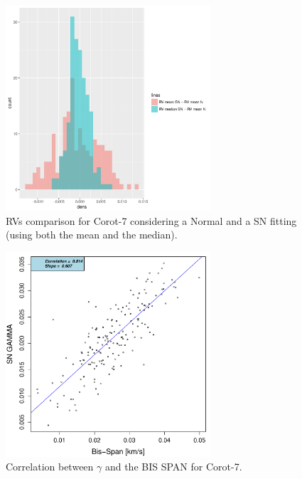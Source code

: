 \documentclass{aa}
\begin{document}
%
\begin{figure}[htbp]
   \centering
\includegraphics[height = 3in]{[0]LRa01_E_HistogramsDiff.pdf} 
   \caption{RVs comparison for Corot-7 considering a Normal and a SN fitting (using both the mean and the median).}
   \label{fig:corot7:RV}
\end{figure}
%
\begin{figure}[htbp]
   \centering
\includegraphics[height = 3in]{LRa01_E_[2]gamma_vs_bisspan.pdf} 
   \caption{Correlation between $\gamma$ and the BIS SPAN for Corot-7.}
   \label{fig:Corot7:corr.gamma}
\end{figure}
%
\fi
%


%


\end{document}
